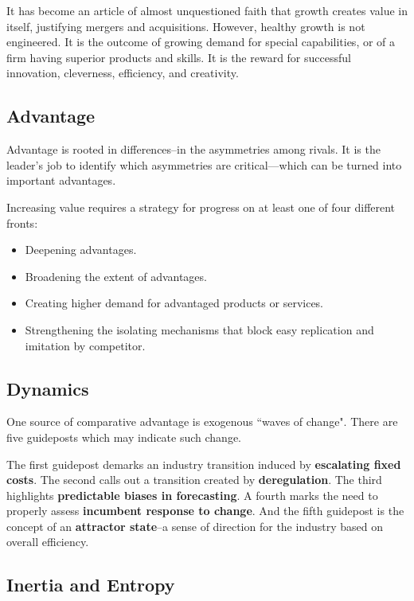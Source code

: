 \documentclass{article}
\newenvironment{nosepitemize}
{ \begin{itemize}
    \setlength{\itemsep}{0pt}
    \setlength{\parskip}{0pt}
    \setlength{\parsep}{0pt}     }
{ \end{itemize}                  }
\begin{document}
\begin{multicols}{2}
It has become an article of almost unquestioned faith that growth creates value in itself, justifying mergers and acquisitions. However, healthy growth is not engineered. It is the outcome of growing demand for special capabilities, or of a firm having superior products and skills. It is the reward for successful innovation, cleverness, efficiency, and creativity.

\subsection{Advantage}
Advantage is rooted in differences–in the asymmetries among rivals. It is the leader’s job to identify which asymmetries are critical—which can be turned into important advantages.

Increasing value requires a strategy for progress on at least one of four different fronts:

\begin{nosepitemize}
    \item Deepening advantages.
    \item Broadening the extent of advantages.
    \item Creating higher demand for advantaged products or services.
    \item Strengthening the isolating mechanisms that block easy replication and imitation by competitor.
\end{nosepitemize}


\subsection{Dynamics}

One source of comparative advantage is exogenous ``waves of change". There are five guideposts which may indicate such change.

The first guidepost demarks an industry transition induced by \textbf{escalating fixed costs}. The second calls out a transition created by \textbf{deregulation}. The third highlights \textbf{predictable biases in forecasting}. A fourth marks the need to properly assess \textbf{incumbent response to change}. And the fifth guidepost is the concept of an \textbf{attractor state}–a sense of direction for the industry based on overall efficiency.

\subsection{Inertia and Entropy}


\end{multicols}
\end{document}
